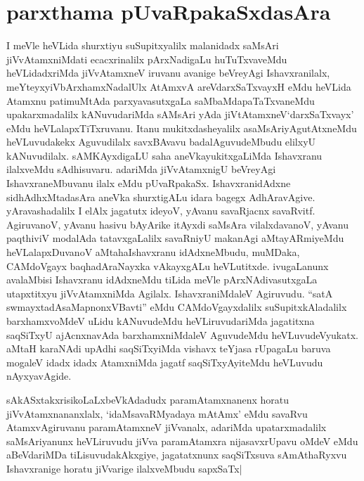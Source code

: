 \section*{parxthama pUvaRpakaSxdasAra}

\begin{artha}
I meVle heVLida shurxtiyu suSupitxyalilx malanidadx saMsAri
jiVvAtamxniMdati ecacxrinalilx pArxNadigaLu huTuTxvaveMdu
heVLidadxriMda jiVvAtamxneV iruvanu avanige beVreyAgi Ishavxranilalx,
meYteyxyiVbArxhamxNadalUlx AtAmxvA areVdarxSaTxvayxH eMdu heVLida
Atamxnu patimuMtAda parxyavasutxgaLa saMbaMdapaTaTxvaneMdu
upakarxmadalilx kANuvudariMda sAMsAri yAda jiVtAtamxneV`darxSaTxvayx'
eMdu heVLalapxTiTxruvanu. Itanu mukitxdasheyalilx
asaMsAriyAgutAtxneMdu heVLuvudakekx Aguvudilalx savxBAvavu
badalAguvudeMbudu elilxyU kANuvudilalx. sAMKAyxdigaLU saha
aneVkayukitxgaLiMda Ishavxranu ilalxveMdu sAdhisuvaru. adariMda
jiVvAtamxnigU beVreyAgi IshavxraneMbuvanu ilalx eMdu
pUvaRpakaSx. IshavxranidAdxne sidhAdhxMtadasAra aneVka shurxtigALu
idara bagegx  AdhAravAgive. yAravashadalilx I elAlx jagatutx ideyoV,
yAvanu savaRjacnx savaRvitf. AgiruvanoV, yAvanu hasivu bAyArike
itAyxdi saMsAra vilalxdavanoV, yAvanu paqthiviV modalAda
tatavxgaLalilx savaRniyU makanAgi aMtayARmiyeMdu heVLalapxDuvanoV
aMtahaIshavxranu idAdxneMbudu, muMDaka, CAMdoVgayx baqhadAraNayxka
vAkayxgALu heVLutitxde. ivugaLanunx avalaMbisi Ishavxranu idAdxneMdu
tiLida meVle pArxNAdivasutxgaLa utapxtitxyu jiVvAtamxniMda
Agilalx. IshavxraniMdaleV Agiruvudu. ``satA
swmayxtadAsaMapnonxVBavti'' eMdu CAMdoVgayxdalilx suSupitxkAladalilx
barxhamxvoMdeV uLidu kANuvudeMdu heVLiruvudariMda jagatitxna saqSiTxyU
ajAcnxnavAda barxhamxniMdaleV AguvudeMdu heVLuvudeVyukatx. aMtaH
karaNAdi upAdhi saqSiTxyiMda vishavx teYjasa rUpagaLu baruva mogaleV
idadx idadx AtamxniMda jagatf saqSiTxyAyiteMdu heVLuvudu nAyxyavAgide.
\end{artha}


\begin{artha}
sAkASxtakxrisikoLaLxbeVkAdadudx paramAtamxnanenx horatu
jiVvAtamxnananxlalx, `idaMsavaRMyadaya mAtAmx' eMdu savaRvu
AtamxvAgiruvanu paramAtamxneV jiVvanalx, adariMda upatarxmadalilx
saMsAriyanunx heVLiruvudu jiVva paramAtamxra nijasavxrUpavu oMdeV eMdu
aBeVdariMDa tiLisuvudakAkxgiye, jagatatxnunx saqSiTxsuva sAmAthaRyxvu
Ishavxranige horatu jiVvarige ilalxveMbudu sapxSaTx|
\end{artha}



